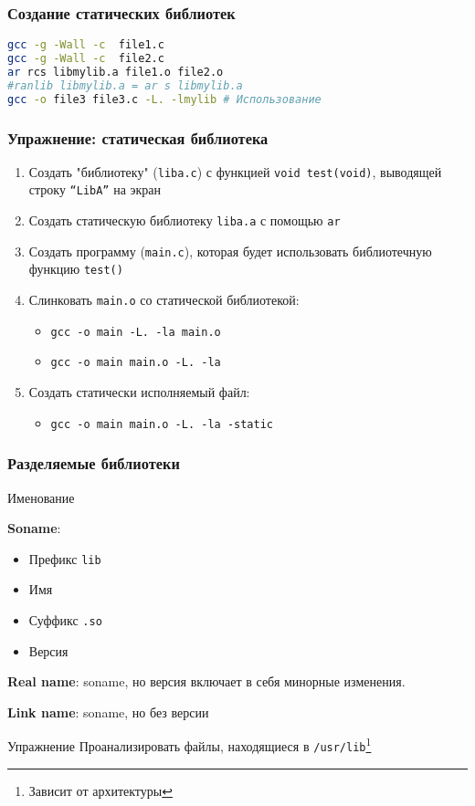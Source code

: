\begin{frame}[fragile]
 \frametitle{Создание статических библиотек}
\begin{lstlisting}[language=sh]
gcc -g -Wall -c  file1.c
gcc -g -Wall -c  file2.c
ar rcs libmylib.a file1.o file2.o
#ranlib libmylib.a = ar s libmylib.a
gcc -o file3 file3.c -L. -lmylib # Использование
\end{lstlisting}

\end{frame}

\begin{frame}
	\frametitle{Упражнение: статическая библиотека}

	\begin{enumerate}
		\item Создать "библиотеку" ({\tt liba.c})
			с функцией {\tt void test(void)}, выводящей строку {\tt ``LibA''} на экран
		\item Создать статическую библиотеку {\tt liba.a} с помощью {\tt ar}
		\item Создать программу ({\tt main.c}), которая будет использовать 
			библиотечную функцию {\tt test()}
		\item Слинковать {\tt main.o} со статической библиотекой:
			\begin{itemize}
				\item {\tt gcc -o main -L. -la main.o }
				\item {\tt gcc -o main main.o -L. -la }
			\end{itemize}
		\item Создать статически исполняемый файл: 
			\begin{itemize}
				\item {\tt gcc -o main main.o -L. -la -static}
			\end{itemize}

	\end{enumerate}
\end{frame}


\begin{frame}
	\frametitle{Разделяемые библиотеки}

	\begin{block}{Именование}
	
		{\bf Soname}:
		\begin{itemize}
				\item Префикс {\tt lib}
				\item Имя
				\item Суффикс {\tt .so}
				\item Версия
		\end{itemize}

		{\bf Real name}: soname, но версия включает в себя минорные изменения.

		{\bf Link name}: soname, но без версии

	\end{block}

	\begin{block}{Упражнение}
		Проанализировать файлы, находящиеся в {\tt /usr/lib}\footnote{Зависит от архитектуры}
	\end{block}


\end{frame}

